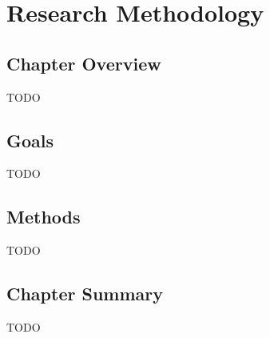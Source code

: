 \chapter{Research Methodology}
\label{chap:methodology}

\section{Chapter Overview}

TODO

\section{Goals}

TODO

\section{Methods}

TODO

\section{Chapter Summary}

TODO
